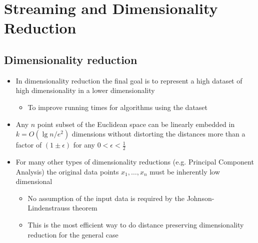\section{Streaming and Dimensionality Reduction}
\subsection{Dimensionality reduction}
\begin{itemize}
	\item In dimensionality reduction the final goal is to represent a high dataset of high dimensionality in a lower dimensionality
  \begin{itemize}
  	\item To improve running times for algorithms using the dataset
  \end{itemize}
  \item Any $n$ point subset of the Euclidean space can be linearly embedded in $k=O(\lg n / e^2)$ dimensions without distorting the distances more than a factor of $(1 \pm \epsilon)$ for any $0 < \epsilon < \frac12$ 
  \item For many other types of dimensionality reductions (e.g. Principal Component Analysis) the original data points $x_1, \dots, x_n$ must be inherently low dimensional
  \begin{itemize}
  	\item No assumption of the input data is required by the Johnson-Lindenstrauss theorem
    \item This is the most efficient way to do distance preserving dimensionality reduction for the general case
  \end{itemize}
\end{itemize}

